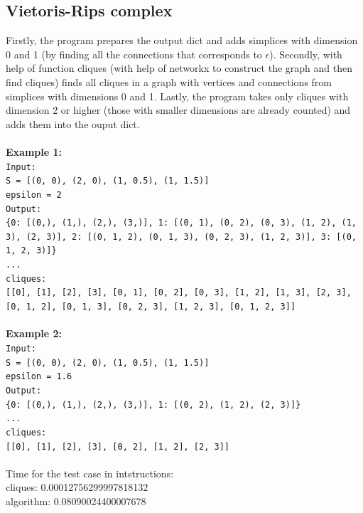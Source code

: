 \documentclass[a4paper,11pt]{article}
\begin{document}
\subsection{Vietoris-Rips complex}
Firstly, the program prepares the output dict and adds simplices with dimension 0 and 1 (by finding all the connections that corresponds to $\epsilon$).
Secondly, with help of function cliques (with help of networkx to construct the graph and then find cliques) finds all cliques in a graph with vertices and connections from simplices with dimensions 0 and 1.
Lastly, the program takes only cliques with dimension 2 or higher (those with smaller dimensions are already counted) and adds them into the ouput dict.
\\
\\
\textbf{Example 1:}
\\
\texttt{Input:}
\\
\texttt{S = [(0, 0), (2, 0), (1, 0.5), (1, 1.5)]}
\\
\texttt{epsilon = 2}
\\
\texttt{Output:}
\\
\texttt{\{0: [(0,), (1,), (2,), (3,)],
1: [(0, 1), (0, 2), (0, 3), (1, 2), (1, 3), (2, 3)],
2: [(0, 1, 2), (0, 1, 3), (0, 2, 3), (1, 2, 3)],
3: [(0, 1, 2, 3)]\}}
\\
\texttt{...}
\\
\texttt{cliques: }
\\
\texttt{[[0], [1], [2], [3], [0, 1], [0, 2], [0, 3], [1, 2], [1, 3], [2, 3], [0, 1, 2], [0, 1, 3], [0, 2, 3], [1, 2, 3], [0, 1, 2, 3]]}
\\
\\
\textbf{Example 2:}
\\
\texttt{Input:}
\\
\texttt{S = [(0, 0), (2, 0), (1, 0.5), (1, 1.5)]}
\\
\texttt{epsilon = 1.6}
\\
\texttt{Output:}
\\
\texttt{\{0: [(0,), (1,), (2,), (3,)], 1: [(0, 2), (1, 2), (2, 3)]\}}
\\
\texttt{...}
\\
\texttt{cliques: }
\\
\texttt{[[0], [1], [2], [3], [0, 2], [1, 2], [2, 3]]}
\\
\\
Time for the test case in intstructions:
\\
cliques: 0.00012756299997818132
\\
algorithm: 0.08090024400007678
\\
\end{document}
